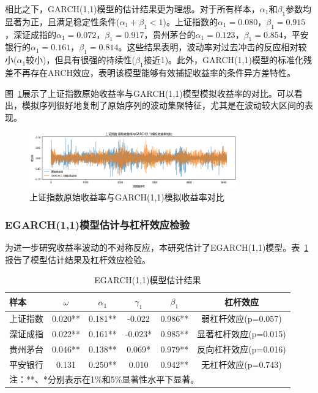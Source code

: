 \documentclass[12pt, a4paper]{article}
\begin{document}
相比之下，GARCH(1,1)模型的估计结果更为理想。对于所有样本，$\alpha_1$和$\beta_1$参数均显著为正，且满足稳定性条件($\alpha_1+\beta_1<1$)。上证指数的$\alpha_1=0.080$，$\beta_1=0.915$，深证成指的$\alpha_1=0.072$，$\beta_1=0.917$，贵州茅台的$\alpha_1=0.123$，$\beta_1=0.854$，平安银行的$\alpha_1=0.161$，$\beta_1=0.814$。这些结果表明，波动率对过去冲击的反应相对较小($\alpha_1$较小)，但具有很强的持续性($\beta_1$接近1)。此外，GARCH(1,1)模型的标准化残差不再存在ARCH效应，表明该模型能够有效捕捉收益率的条件异方差特性。

图~\ref{fig:garch_simulation}展示了上证指数原始收益率与GARCH(1,1)模型模拟收益率的对比。可以看出，模拟序列很好地复制了原始序列的波动集聚特征，尤其是在波动较大区间的表现。

\begin{figure}[htbp]
\centering
\includegraphics[width=0.8\textwidth]{fig/garch_simulation.png}
\caption{上证指数原始收益率与GARCH(1,1)模拟收益率对比}
\label{fig:garch_simulation}
\end{figure}

\subsubsection{EGARCH(1,1)模型估计与杠杆效应检验}

为进一步研究收益率波动的不对称反应，本研究估计了EGARCH(1,1)模型。表~\ref{tab:egarch_estimation}报告了模型估计结果及杠杆效应检验。

\begin{table}[htbp]
\centering
\caption{EGARCH(1,1)模型估计结果}
\label{tab:egarch_estimation}
\begin{tabular}{lccccc}
\toprule
样本 & $\omega$ & $\alpha_1$ & $\gamma_1$ & $\beta_1$ & 杠杆效应 \\
\midrule
上证指数 & 0.020** & 0.181** & -0.022 & 0.986** & 弱杠杆效应(p=0.057) \\
深证成指 & 0.022** & 0.161** & -0.023* & 0.985** & 显著杠杆效应(p=0.015) \\
贵州茅台 & 0.046** & 0.138** & 0.069* & 0.979** & 反向杠杆效应(p=0.016) \\
平安银行 & 0.131 & 0.250** & 0.010 & 0.942** & 无杠杆效应(p=0.743) \\
\bottomrule
\multicolumn{6}{l}{\footnotesize{注：**、*分别表示在1\%和5\%显著性水平下显著。}} \\
\end{tabular}
\end{table}
\end{document}
